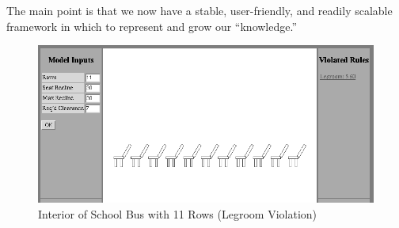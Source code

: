 \documentclass [11pt]{book}
\begin{document}
The main point is that we now have a stable, user-friendly, and
readily scalable framework in which to represent and grow 
our ``knowledge.''


\begin{figure}
\begin{center}
\includegraphics{../images/school-bus-interior-violated.png}
\end{center}

\caption{Interior of School Bus with 11 Rows (Legroom Violation)}

\label{fig:school-bus-violated}

\end{figure}


\backmatter



\printindex
\end{document}
